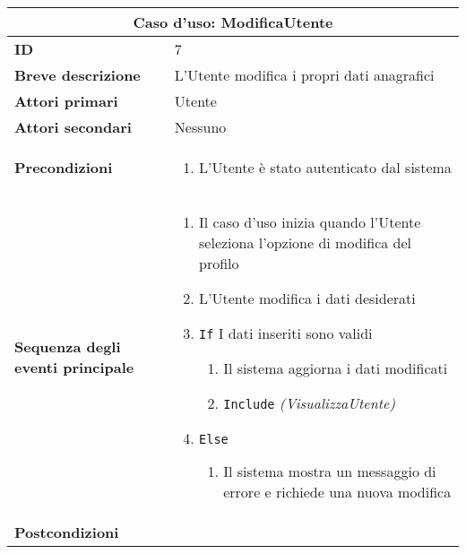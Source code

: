\documentclass[a4paper]{report}
\begin{document}
\clearpage
\begin{table}[H]
\vspace*{-0cm}
\renewcommand{\arraystretch}{1.9}
\begin{tabular}{|p{3.9cm}|p{9.9cm}|}
\hline
\multicolumn{2}{|c|}{\textbf{Caso d’uso: ModificaUtente}} \\ \hline
\textbf{ID} & 7 \\ \hline
\textbf{Breve descrizione} &  L’Utente modifica i propri dati anagrafici \\ \hline
\textbf{Attori primari} & Utente \\ \hline
\textbf{Attori secondari} & Nessuno \\ \hline
\textbf{Precondizioni} & \begin{enumerate}[leftmargin=14pt,label=\arabic*.,labelsep=0.5em,topsep=0pt,partopsep=0pt,parsep=0pt,itemsep=0pt]
    \item L’Utente è stato autenticato dal sistema
\end{enumerate} \\ \hline
\textbf{Sequenza degli eventi principale} &
\begin{enumerate}[leftmargin=14pt,label=\arabic*.,labelsep=0.5em,topsep=0pt,partopsep=0pt,parsep=0pt,itemsep=0pt]
    \item Il caso d'uso inizia quando l’Utente seleziona l'opzione di modifica del profilo
    \item L'Utente modifica i dati desiderati
    \item \texttt{If} I dati inseriti sono validi
    \begin{enumerate}[label=\arabic{enumi}.\arabic*.,leftmargin=22pt,labelsep=0.5em,topsep=0pt,partopsep=0pt,parsep=0pt,itemsep=0pt]
        \item Il sistema aggiorna i dati modificati
        \item \texttt{Include} \textit{(VisualizzaUtente)} 
    \end{enumerate}
    \item \texttt{Else}
    \begin{enumerate}[label=\arabic{enumi}.\arabic*.,leftmargin=22pt,labelsep=0.5em,topsep=0pt,partopsep=0pt,parsep=0pt,itemsep=0pt]
        \item Il sistema mostra un messaggio di errore e richiede una nuova modifica
    \end{enumerate}
\end{enumerate}\\ \hline
\textbf{Postcondizioni} & \begin{enumerate}[leftmargin=14pt,label=\arabic*.,labelsep=0.5em,topsep=0pt,partopsep=0pt,parsep=0pt,itemsep=0pt]

\end{enumerate}
\end{tabular}
\end{table}
\end{document}
